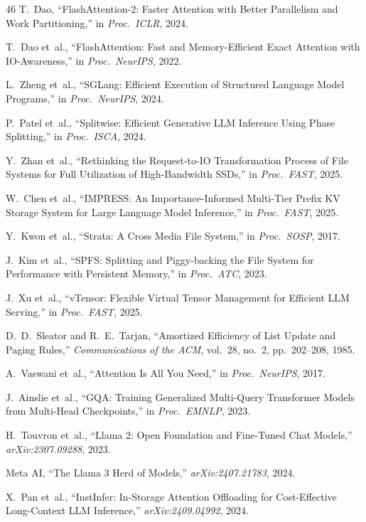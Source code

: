 \documentclass[conference]{IEEEtran}
\begin{document}
\begin{thebibliography}{46}
 T.~Dao, ``FlashAttention-2: Faster Attention with Better Parallelism and Work Partitioning,'' in \textit{Proc.\ ICLR}, 2024.

 T.~Dao et~al., ``FlashAttention: Fast and Memory-Efficient Exact Attention with IO-Awareness,'' in \textit{Proc.\ NeurIPS}, 2022.

 L.~Zheng et~al., ``SGLang: Efficient Execution of Structured Language Model Programs,'' in \textit{Proc.\ NeurIPS}, 2024.

 P.~Patel et~al., ``Splitwise: Efficient Generative LLM Inference Using Phase Splitting,'' in \textit{Proc.\ ISCA}, 2024.

 Y.~Zhan et~al., ``Rethinking the Request-to-IO Transformation Process of File Systems for Full Utilization of High-Bandwidth SSDs,'' in \textit{Proc.\ FAST}, 2025.

 W.~Chen et~al., ``IMPRESS: An Importance-Informed Multi-Tier Prefix KV Storage System for Large Language Model Inference,'' in \textit{Proc.\ FAST}, 2025.

 Y.~Kwon et~al., ``Strata: A Cross Media File System,'' in \textit{Proc.\ SOSP}, 2017.

 J.~Kim et~al., ``SPFS: Splitting and Piggy-backing the File System for Performance with Persistent Memory,'' in \textit{Proc.\ ATC}, 2023.

 J.~Xu et~al., ``vTensor: Flexible Virtual Tensor Management for Efficient LLM Serving,'' in \textit{Proc.\ FAST}, 2025.

 D.~D.~Sleator and R.~E.~Tarjan, ``Amortized Efficiency of List Update and Paging Rules,'' \textit{Communications of the ACM}, vol.~28, no.~2, pp.~202--208, 1985.

 A.~Vaswani et~al., ``Attention Is All You Need,'' in \textit{Proc.\ NeurIPS}, 2017.

 J.~Ainslie et~al., ``GQA: Training Generalized Multi-Query Transformer Models from Multi-Head Checkpoints,'' in \textit{Proc.\ EMNLP}, 2023.

 H.~Touvron et~al., ``Llama 2: Open Foundation and Fine-Tuned Chat Models,'' \textit{arXiv:2307.09288}, 2023.

 Meta AI, ``The Llama 3 Herd of Models,'' \textit{arXiv:2407.21783}, 2024.

 X.~Pan et~al., ``InstInfer: In-Storage Attention Offloading for Cost-Effective Long-Context LLM Inference,'' \textit{arXiv:2409.04992}, 2024.



\end{thebibliography}
\end{document}
